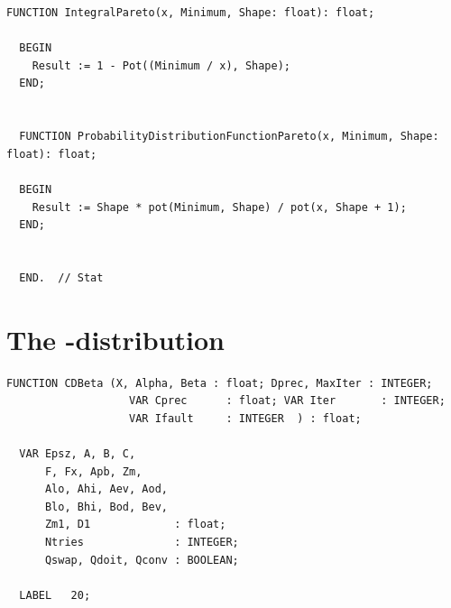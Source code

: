 \begin{refsection}
\begin{lstlisting}[caption=The \Name{Pareto} distribution]
  FUNCTION IntegralPareto(x, Minimum, Shape: float): float;

  BEGIN
    Result := 1 - Pot((Minimum / x), Shape);
  END;


  FUNCTION ProbabilityDistributionFunctionPareto(x, Minimum, Shape: float): float;

  BEGIN
    Result := Shape * pot(Minimum, Shape) / pot(x, Shape + 1);
  END;


  END.  // Stat
\end{lstlisting}

\section{The \textbeta-distribution}

\begin{lstlisting}[caption=\textbeta distribution]
  FUNCTION CDBeta (X, Alpha, Beta : float; Dprec, MaxIter : INTEGER;
                   VAR Cprec      : float; VAR Iter       : INTEGER;
                   VAR Ifault     : INTEGER  ) : float;

  VAR Epsz, A, B, C,
      F, Fx, Apb, Zm,
      Alo, Ahi, Aev, Aod,
      Blo, Bhi, Bod, Bev,
      Zm1, D1             : float;
      Ntries              : INTEGER;
      Qswap, Qdoit, Qconv : BOOLEAN;

  LABEL   20;


\end{lstlisting}
\end{refsection}
